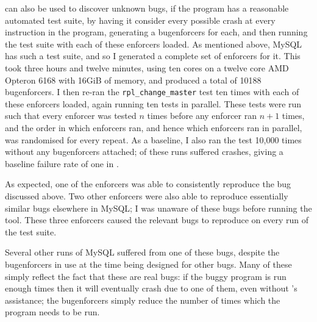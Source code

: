 {\Technique} can also be used to discover unknown bugs, if the program
has a reasonable automated test suite, by having it consider every
possible crash at every instruction in the program, generating a
\glspl{bugenforcer} for each, and then running the test suite with
each of these enforcers loaded.  As mentioned above, MySQL has such a
test suite, and so I generated a complete set of enforcers for it.
This took three hours and twelve minutes, using
ten cores on a twelve core AMD Opteron 6168 with 16GiB of memory, and
produced a total of 10188 \glspl{bugenforcer}.  I then re-ran the
\texttt{rpl\_change\_master} test ten times with each of these
enforcers loaded, again running ten tests in parallel.  These tests
were run such that every enforcer was tested $n$ times before any
enforcer ran $n+1$ times, and the order in which enforcers ran, and
hence which enforcers ran in parallel, was randomised for every
repeat.  As a baseline, I also ran the test 10,000 times without any
\glspl{bugenforcer} attached;  of these runs suffered
crashes, giving a baseline failure rate of one in .

As expected, one of the enforcers was able to consistently reproduce
the  bug discussed above.  Two other enforcers were
also able to reproduce essentially similar bugs elsewhere in MySQL; I
was unaware of these bugs before running the tool.  These three
enforcers caused the relevant bugs to reproduce on every run of the
test suite.

Several other runs of MySQL suffered from one of these bugs, despite
the \glspl{bugenforcer} in use at the time being designed for other
bugs.  Many of these simply reflect the fact that these are real bugs:
if the buggy program is run enough times then it will eventually crash
due to one of them, even without {\technique}'s assistance; the
\glspl{bugenforcer} simply reduce the number of times which the
program needs to be run.



